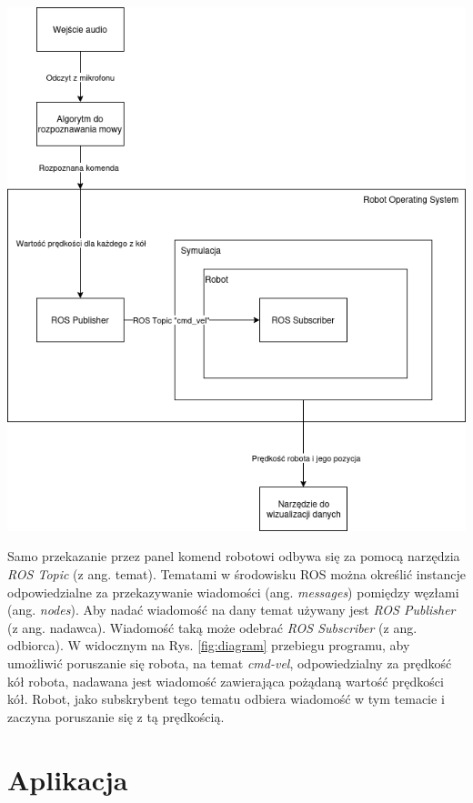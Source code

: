 \begin{center}
    \includegraphics[width=0.95\linewidth]{files/diagram.png}
    \label{fig:diagram}
\end{center}

Samo przekazanie przez panel komend robotowi odbywa się za pomocą narzędzia \textit{ROS Topic} (z ang. temat). Tematami w środowisku ROS można określić instancje odpowiedzialne za przekazywanie wiadomości (ang. \textit{messages}) pomiędzy węzłami (ang. \textit{nodes}). Aby nadać wiadomość na dany temat używany jest \textit{ROS Publisher} (z ang. nadawca). Wiadomość taką może odebrać \textit{ROS Subscriber} (z ang. odbiorca). W widocznym na Rys. \ref{fig:diagram} przebiegu programu, aby umożliwić poruszanie się robota, na temat \textit{cmd-vel}, odpowiedzialny za prędkość kół robota, nadawana jest wiadomość zawierająca pożądaną wartość prędkości kół. Robot, jako subskrybent tego tematu odbiera wiadomość w tym temacie i zaczyna poruszanie się z tą prędkością. 


\section{Aplikacja}
\label{sec:App}

